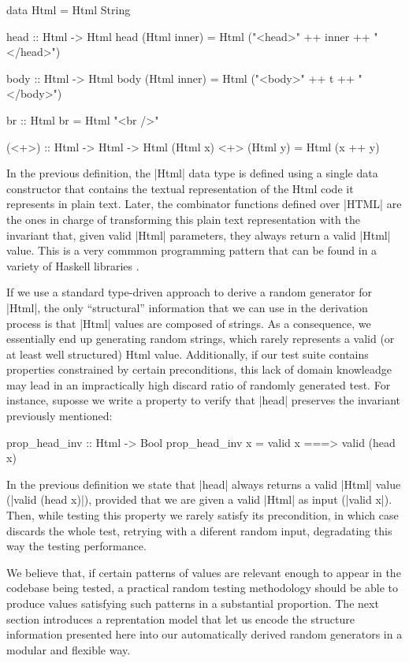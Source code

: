 \begin{code}
data Html = Html String

head :: Html -> Html
head (Html inner)
  = Html ("<head>" ++ inner ++ "</head>")

body :: Html -> Html
body (Html inner)
  = Html ("<body>" ++ t ++ "</body>")

br :: Html
br = Html "<br />"

(<+>) :: Html -> Html -> Html
(Html x) <+> (Html y) = Html (x ++ y)
\end{code}

In the previous definition, the |Html| data type is defined using a single data
constructor that contains the textual representation of the Html code it
represents in plain text.
%
Later, the combinator functions defined over |HTML| are the ones in charge of
transforming this plain text representation with the invariant that, given valid
|Html| parameters, they always return a valid |Html| value.
%
This is a very commmon programming pattern that can be found in a variety of
Haskell libraries \tocite{}.


If we use a standard type-driven approach to derive a random generator for
|Html|, the only ``structural'' information that we can use in the derivation
process is that |Html| values are composed of strings.
%
As a consequence, we essentially end up generating random strings, which rarely
represents a valid (or at least well structured) Html value.
%
Additionally, if our test suite contains properties constrained by certain
preconditions, this lack of domain knowleadge may lead in an impractically high
discard ratio of randomly generated test.
%
For instance, suposse we write a property to verify that |head| preserves the
invariant previously mentioned:

\begin{code}
prop_head_inv :: Html -> Bool
prop_head_inv x = valid x ===> valid (head x)
\end{code}

In the previous definition we state that |head| always returns a valid |Html|
value (|valid (head x)|), provided that we are given a valid |Html| as input
(|valid x|).
%
Then, while testing this property we rarely satisfy its precondition, in which
case \quickcheck discards the whole test, retrying with a diferent random input,
degradating this way the testing performance.


We believe that, if certain patterns of values are relevant enough to appear in
the codebase being tested, a practical random testing methodology should be able
to produce values satisfying such patterns in a substantial proportion.
%
The next section introduces a reprentation model that let us encode the
structure information presented here into our automatically derived random
generators in a modular and flexible way.
